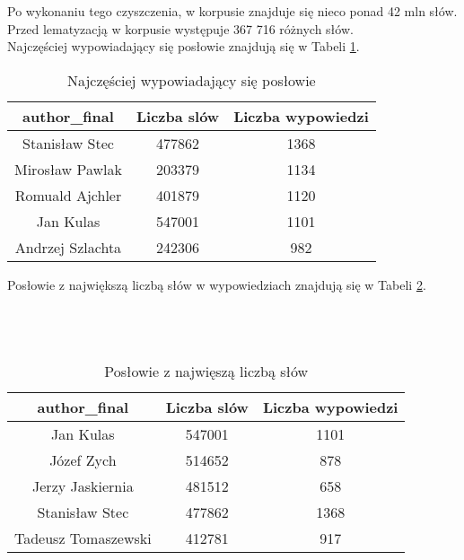 \documentclass[a4paper,11pt,twoside]{report}
\theoremstyle{definition}
\begin{document}
Po wykonaniu tego czyszczenia, w korpusie znajduje się nieco ponad 42 mln słów. Przed lematyzacją w korpusie występuje 367 716 różnych słów.\\
Najczęściej wypowiadający się posłowie znajdują się w Tabeli \ref{t41}. 

\begin{table}[h] \centering
\begin{tabular}{|c|c|c|}
\hline
author\_final & Liczba slów	& Liczba wypowiedzi \\\hline
Stanisław Stec	& 477862 & 	1368 \\\hline
Mirosław Pawlak	& 203379 & 	1134 \\\hline
Romuald Ajchler	& 401879 	& 1120 \\\hline
Jan Kulas	& 547001	& 1101 \\\hline
Andrzej Szlachta	& 242306	 &  982 \\
\hline
\end{tabular} \caption{Najczęściej wypowiadający się posłowie} \label{t41}
\end{table}

Posłowie z największą liczbą słów w wypowiedziach znajdują się w Tabeli \ref{t42}.\\\\\\\\


\begin{table}[h!] \centering
\begin{tabular}{|c|c|c|}
\hline
author\_final	& Liczba slów	& Liczba wypowiedzi \\\hline
Jan Kulas	& 	547001	& 	1101 \\\hline
Józef Zych	& 	514652	& 	878 \\\hline
Jerzy Jaskiernia	& 	481512	& 	658 \\\hline
Stanisław Stec	& 	477862	& 	1368 \\\hline
Tadeusz Tomaszewski	& 	412781	& 	917 \\\hline
\end{tabular} \caption{Posłowie z najwięszą liczbą słów} \label{t42}
\end{table}
\end{document}
